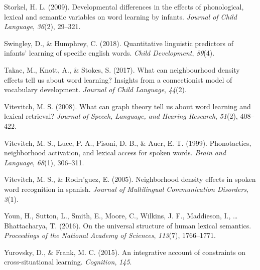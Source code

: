 \documentclass[english,,man,floatsintext]{apa6}
\begin{document}
\leavevmode\hypertarget{ref-storkel2009}{}%
Storkel, H. L. (2009). Developmental differences in the effects of phonological, lexical and semantic variables on word learning by infants. \emph{Journal of Child Language}, \emph{36}(2), 29--321.

\leavevmode\hypertarget{ref-swingley2018}{}%
Swingley, D., \& Humphrey, C. (2018). Quantitative linguistic predictors of infants' learning of specific english words. \emph{Child Development}, \emph{89}(4).

\leavevmode\hypertarget{ref-takac2017}{}%
Takac, M., Knott, A., \& Stokes, S. (2017). What can neighbourhood density effects tell us about word learning? Insights from a connectionist model of vocabulary development. \emph{Journal of Child Language}, \emph{44}(2).

\leavevmode\hypertarget{ref-vitevitch2008}{}%
Vitevitch, M. S. (2008). What can graph theory tell us about word learning and lexical retrieval? \emph{Journal of Speech, Language, and Hearing Research}, \emph{51}(2), 408--422.

\leavevmode\hypertarget{ref-vitevitch1999}{}%
Vitevitch, M. S., Luce, P. A., Pisoni, D. B., \& Auer, E. T. (1999). Phonotactics, neighborhood activation, and lexical access for spoken words. \emph{Brain and Language}, \emph{68}(1), 306--311.

\leavevmode\hypertarget{ref-vitevitch2005}{}%
Vitevitch, M. S., \& Rodrı'guez, E. (2005). Neighborhood density effects in spoken word recognition in spanish. \emph{Journal of Multilingual Communication Disorders}, \emph{3}(1).

\leavevmode\hypertarget{ref-youn2016}{}%
Youn, H., Sutton, L., Smith, E., Moore, C., Wilkins, J. F., Maddieson, I., \ldots{} Bhattacharya, T. (2016). On the universal structure of human lexical semantics. \emph{Proceedings of the National Academy of Sciences}, \emph{113}(7), 1766--1771.

\leavevmode\hypertarget{ref-yurovsky2015}{}%
Yurovsky, D., \& Frank, M. C. (2015). An integrative account of constraints on cross-situational learning. \emph{Cognition}, \emph{145}.
\end{document}
